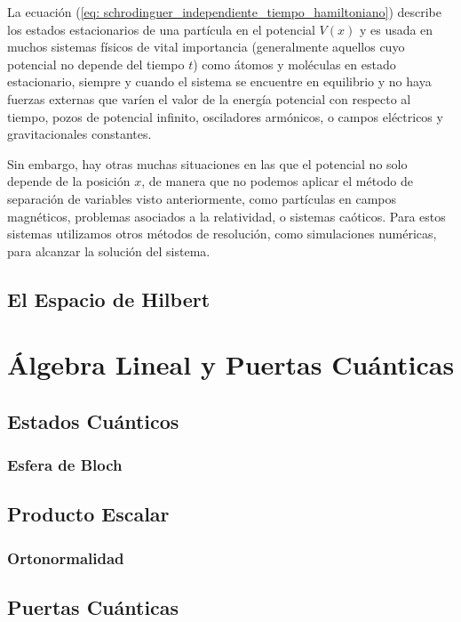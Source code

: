 \documentclass{article}
\numberwithin{equation}{section} %
\begin{document}
    \vspace{5mm}

    La ecuación (\ref{eq: schrodinguer_independiente_tiempo_hamiltoniano}) describe los estados estacionarios de una partícula en el potencial \( V(x) \) y es usada en muchos sistemas físicos de vital importancia (generalmente aquellos cuyo potencial no depende del tiempo \( t \)) como átomos y moléculas en estado estacionario, siempre y cuando el sistema se encuentre en equilibrio y no haya fuerzas externas que varíen el valor de la energía potencial con respecto al tiempo, pozos de potencial infinito, osciladores armónicos, o campos eléctricos y gravitacionales constantes.

    \vspace{5mm}

    Sin embargo, hay otras muchas situaciones en las que el potencial no solo depende de la posición \( x \), de manera que no podemos aplicar el método de separación de variables visto anteriormente, como partículas en campos magnéticos, problemas asociados a la relatividad, o sistemas caóticos. Para estos sistemas utilizamos otros métodos de resolución, como simulaciones numéricas, para alcanzar la solución del sistema.

    \vspace{5mm}

    \subsection{El Espacio de Hilbert}
    \section{Álgebra Lineal y Puertas Cuánticas}
    \subsection{Estados Cuánticos}
    \subsubsection{Esfera de Bloch}    
    \subsection{Producto Escalar}
    \subsubsection{Ortonormalidad}
    \subsection{Puertas Cuánticas}
\end{document}
